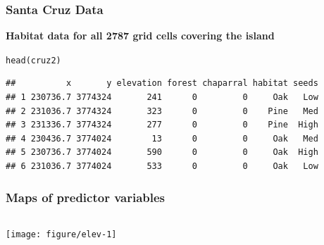 \documentclass[color=usenames,dvipsnames]{beamer}\usepackage[]{graphicx}\usepackage[]{color}
\makeatletter
\newcommand{\hlstd}[1]{\textcolor[rgb]{0,0,0}{#1}}%
\newcommand{\hlkwd}[1]{\textcolor[rgb]{0.004,0.004,0.506}{#1}}%
\newenvironment{kframe}{%
 \def\at@end@of@kframe{}%
 \ifinner\ifhmode%
  \def\at@end@of@kframe{\end{minipage}}%
  \begin{minipage}{\columnwidth}%
 \fi\fi%
 \def\FrameCommand##1{\hskip\@totalleftmargin \hskip-\fboxsep
 \colorbox{shadecolor}{##1}\hskip-\fboxsep
     \hskip-\linewidth \hskip-\@totalleftmargin \hskip\columnwidth}%
 \MakeFramed {\advance\hsize-\width
   \@totalleftmargin\z@ \linewidth\hsize
   \@setminipage}}%
 {\par\unskip\endMakeFramed%
 \at@end@of@kframe}
\newenvironment{knitrout}{}{} %
\makeatother
\begin{document}
\begin{frame}[fragile]
  \frametitle{Santa Cruz Data}
  \footnotesize
\begin{knitrout}
\color{fgcolor}\begin{kframe}


{\ttfamily\noindent\itshape\color{messagecolor}{\#\# Loading required package: lattice}}

{\ttfamily\noindent\itshape\color{messagecolor}{\#\# Loading required package: parallel}}

{\ttfamily\noindent\itshape\color{messagecolor}{\#\# Loading required package: Rcpp}}

{\ttfamily\noindent\itshape\color{messagecolor}{\#\# Loading required package: reshape2}}\end{kframe}
\end{knitrout}

{\bf Habitat data for all 2787 grid cells covering the island}
\begin{knitrout}
\color{fgcolor}\begin{kframe}
\begin{alltt}
\hlkwd{head}\hlstd{(cruz2)}
\end{alltt}
\begin{verbatim}
##          x       y elevation forest chaparral habitat seeds
## 1 230736.7 3774324       241      0         0     Oak   Low
## 2 231036.7 3774324       323      0         0    Pine   Med
## 3 231336.7 3774324       277      0         0    Pine  High
## 4 230436.7 3774024        13      0         0     Oak   Med
## 5 230736.7 3774024       590      0         0     Oak  High
## 6 231036.7 3774024       533      0         0     Oak   Low
\end{verbatim}
\end{kframe}
\end{knitrout}
\end{frame}



\begin{frame}[fragile]
  \frametitle{Maps of predictor variables}
  \scriptsize

\begin{columns}
  \column{\dimexpr\paperwidth-10pt}
  \texttt{[image: figure/elev-1]}
\end{columns}
\end{frame}
\end{document}
